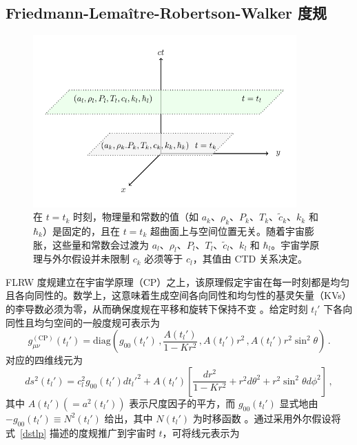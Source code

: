 \documentclass[jkps,preprint,fleqn]{revtex4}
\newcommand{\tc}{\tilde{c}}
\begin{document}
\begin{CJK*}{UTF8}{gbsn}
\section{Friedmann-Lemaître-Robertson-Walker 度规}
\label{sec:RWm}
\begin{figure}
	\begin{center}
	\includegraphics[width=0.9\textwidth]{Fig1.pdf}
	\caption{在 $t = t_k$ 时刻，物理量和常数的值（如 $a_k$、$\rho_k$、$P_k$、$T_k$、$\tc_k$、$k_{k}$ 和 $\hbar_k$）是固定的，且在 $t=t_k$ 超曲面上与空间位置无关。随着宇宙膨胀，这些量和常数会过渡为 $a_l$、$\rho_l$、$P_l$、$T_l$、$\tc_l$、$k_l$ 和 $\hbar_l$。宇宙学原理与外尔假设并未限制 $c_k$ 必须等于 $c_l$，其值由 CTD 关系决定。}
	\label{Fig1}
	\end{center}
\end{figure}
FLRW 度规建立在宇宙学原理（CP）之上，该原理假定宇宙在每一时刻都是均匀且各向同性的。数学上，这意味着生成空间各向同性和均匀性的基灵矢量（KVs）的李导数必须为零，从而确保度规在平移和旋转下保持不变 \cite{Lee:2024mal,Ryder09}。给定时刻 $t_l'$ 下各向同性且均匀空间的一般度规可表示为
\begin{equation}
g_{\mu\nu}^{(\text{CP})}(t_l') = \text{diag} \left( g_{00}(t_l') \,,  \frac{A(t_l')}{1-Kr^2} \,,  A(t_l') r^2 \,,  A(t_l') r^2 \sin^2 \theta \right) \,.
\end{equation}
对应的四维线元为
\begin{equation}
ds^2(t_l') = c_l^2 g_{00}(t_l') dt_l'^2 + A(t_l') \left[ \frac{dr^2}{1-Kr^2} + r^2 d \theta^2 + r^2 \sin^2 \theta d \phi^2 \right] \label{dstlp} \,,
\end{equation}
其中 $A(t_l') (= a^2(t_l'))$ 表示尺度因子的平方，而 \( g_{00}(t_l') \) 显式地由 \(- g_{00}(t_l') \equiv N^2(t_l') \) 给出，其中 \( N(t_l') \) 为时移函数 \cite{Lee:2024zcu,Ryder09}。通过采用外尔假设将式~\eqref{dstlp} 描述的度规推广到宇宙时 $t$，可将线元表示为

\end{CJK*}
\end{document}
